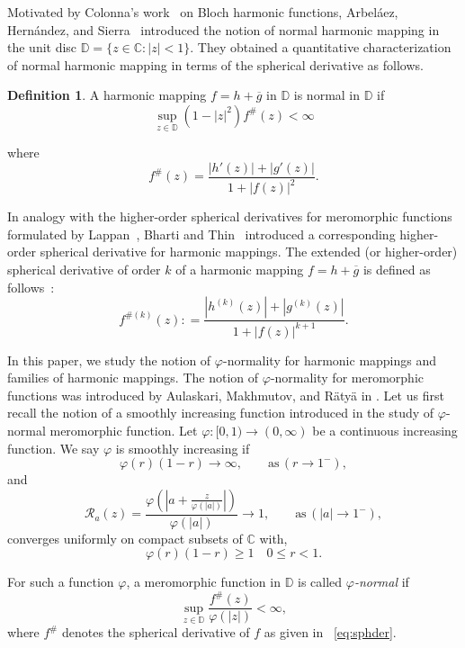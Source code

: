 \documentclass[11pt, reqno]{amsart}
\numberwithin{equation}{section}
\theoremstyle{definition}
\newtheorem{definition}{Definition}[section]
\theoremstyle{remark}
\theoremstyle{plain}
\begin{document}
 Motivated by Colonna's work~\cite{colona} on
  Bloch harmonic functions, Arbel\'aez,
 Hern\'andez, and Sierra~\cite{Arbelaez2019} 
 introduced the notion of normal harmonic mapping in the 
 unit disc $\mathbb{D}=\{z\in \mathbb{C}: |z|<1\}$.
 They obtained a quantitative characterization of normal harmonic 
 mapping in terms of the spherical derivative as follows.
  
\begin{definition}\cite[Proposition 2.1]{Arbelaez2019}
  A harmonic mapping $f=h+\overline{g}$ in $\mathbb{D}$ 
  is normal in $\mathbb{D}$ if 
  \[
  \sup_{z\in\mathbb{D}}(1-|z|^2)f^\#(z)<\infty
  \] 
  
\end{definition}

where
  \begin{equation}\label{eq:sphderhar}
    f^\#(z)=\frac{|h'(z)|+|g'(z)|}{1+|f(z)|^2}.
  \end{equation}

In analogy with the higher-order spherical derivatives for 
meromorphic functions formulated by Lappan~\cite{Lappan1977}, Bharti 
and Thin~\cite{bharatithin} introduced a corresponding
higher-order spherical derivative for harmonic mappings.
The extended (or higher-order) spherical derivative of order $k$ 
 of a harmonic mapping $f=h+\overline{g}$  is defined as follows~\cite[p. 389]{bharatithin}: 
\begin{equation}\label{eq:Ksphderhar}
    f^{\#(k)}(z): =\frac{|h^{(k)}(z)|+|g^{(k)}(z)|}{1+|f(z)|^{k+1}}.
  \end{equation}


In this paper, we study the notion of $\varphi$-normality for harmonic mappings and 
families of harmonic mappings. The notion of  $\varphi$-normality for meromorphic 
functions was introduced by Aulaskari, Makhmutov, and R\"aty\"a in \cite{Aulaskari}. 
Let us first recall the notion of a smoothly increasing function introduced in the study of
 $\varphi$-normal meromorphic function. Let $\varphi:[0,1)\to (0,\infty)$ be a 
continuous increasing function. We say $\varphi$ is smoothly increasing if
\[
\varphi(r)(1-r)\rightarrow \infty,\qquad \text{as}\,  (r\to1^-),
\] 
and
\[
\mathcal{R}_a(z)=\frac{\varphi\left(\left|a+\frac{z}{\varphi(|a|)}
\right|\right)}{\varphi(|a|)}\rightarrow 1, \qquad \text{as}\, 
(|a|\to 1^-),
\]
converges uniformly on compact subsets of $\mathbb{C}$ with,
 \[
\varphi(r)(1-r)\geq1 \quad 0\leq r <1.
\]

For such a function $\varphi$, a meromorphic 
  function in $\mathbb{D}$ is called {\it $\varphi$-normal} if
  \[
  \sup_{z\in\mathbb{D}}\frac{f^\#(z)}{\varphi(|z|)}<\infty,
  \]
  where $f^\#$ denotes the spherical derivative of $f$ as given in ~\eqref{eq:sphder}.
  \smallskip
  
\end{document}
